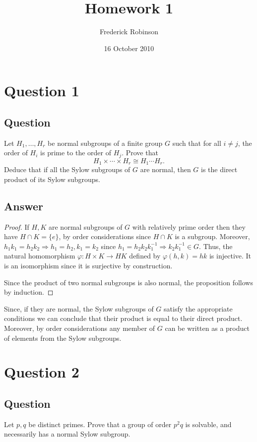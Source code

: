 \documentclass[11pt]{article}
\begin{document}



\title{Homework 1}
\author{Frederick Robinson}
\date{16 October 2010}
\maketitle




\section{Question 1}
\subsection{Question}
Let $H_1, \dots, H_r$ be normal subgroups of a finite group $G$ such that for all $i \neq j$, the order of $H_i$ is prime to the order of $H_j$. Prove that
\[H_1 \times \cdots \times H_r \cong H_1 \cdots H_r .\]
Deduce that if all the Sylow subgroups of $G$ are normal, then $G$ is the direct product of its Sylow subgroups.
\subsection{Answer}
\begin{proof}If $H,K$ are normal subgroups of $G$ with relatively prime order then they have $H \cap K = \{ e \}$, by order considerations since $H \cap K$ is a subgroup.  Moreover, $h_1k_1 = h_2 k_2 \Rightarrow h_1=h_2, k_1=k_2$ since $h_1=h_2k_2 k_1^{-1} \Rightarrow k_2 k_1^{-1} \in G $. Thus, the natural homomorphism $\varphi: H \times K \to  H K$  defined by $\varphi(h,k)=hk$ is injective. It is an isomorphism since it is surjective by construction.

Since the product of two normal subgroups is also normal, the proposition follows by induction.
\end{proof}

Since, if they are normal, the Sylow subgroups of $G$ satisfy the appropriate conditions we can conclude that their product is equal to their direct product. Moreover, by order considerations any member of $G$ can be written as a product of elements from the Sylow subgroups.



\section{Question 2}
\subsection{Question}
Let $p,q$ be distinct primes. Prove that a group of order $p^2q$ is solvable, and necessarily has a normal Sylow subgroup.
\end{document}
